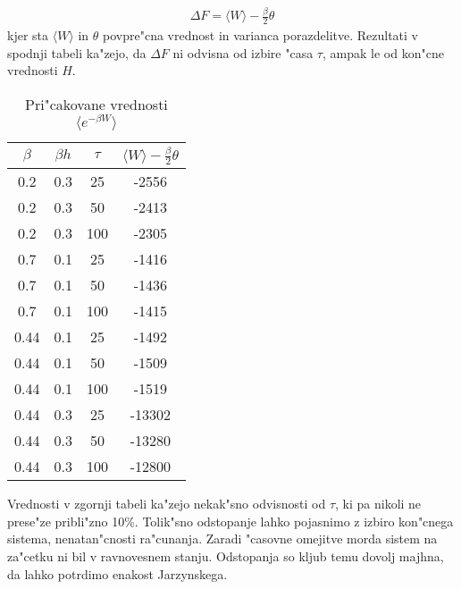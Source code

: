 \documentclass[a4paper,10pt]{article}
\begin{document}
\begin{align}
 \Delta F = \langle W \rangle - \frac{\beta}{2}\theta
\end{align}
kjer sta $\langle W \rangle$ in $\theta$ povpre"cna vrednost in varianca porazdelitve. Rezultati v spodnji tabeli ka"zejo, da $\Delta F$ ni odvisna od izbire "casa $\tau$, ampak le od kon"cne vrednosti $H$. 

\begin{table}[h]
\begin{center}
 \begin{tabular}{|c|c|c|c|}
 \hline
  $\beta$ & $\beta h$ & $\tau$ & $\langle W\rangle - \frac{\beta}{2}\theta$ \\
  \hline
  0.2 & 0.3 & 25 & -2556\\
  0.2 & 0.3 & 50 & -2413\\
  0.2 & 0.3 & 100 & -2305\\
  \hline
  0.7 & 0.1 & 25 & -1416\\
  0.7 & 0.1 & 50 & -1436\\
  0.7 & 0.1 & 100 & -1415\\
  \hline
  0.44 & 0.1 & 25 & -1492\\
  0.44 & 0.1 & 50 & -1509\\
  0.44 & 0.1 & 100 & -1519\\
  \hline
  0.44 & 0.3 & 25 & -13302\\
  0.44 & 0.3 & 50 & -13280\\
  0.44 & 0.3 & 100 & -12800\\
  \hline
 \end{tabular}
 \caption{Pri"cakovane vrednosti $\langle e^{-\beta W}\rangle$}
\end{center}
\end{table}

Vrednosti v zgornji tabeli ka"zejo nekak"sno odvisnosti od $\tau$, ki pa nikoli ne prese"ze pribli"zno 10\%. Tolik"sno odstopanje lahko pojasnimo z izbiro kon"cnega sistema, nenatan"cnosti ra"cunanja. Zaradi "casovne omejitve morda sistem na za"cetku ni bil v ravnovesnem stanju. Odstopanja so kljub temu dovolj majhna, da lahko potrdimo enakost Jarzynskega. 
\end{document}
